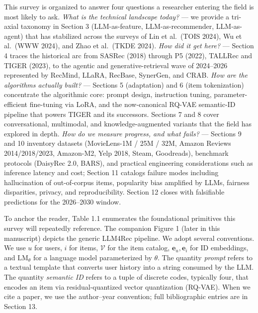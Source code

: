 This survey is organized to answer four questions a researcher entering the field is most likely to ask. \emph{What is the technical landscape today?} --- we provide a tri-axial taxonomy in Section 3 (LLM-as-feature, LLM-as-recommender, LLM-as-agent) that has stabilized across the surveys of Lin et al.~(TOIS 2024), Wu et al.~(WWW 2024), and Zhao et al.~(TKDE 2024). \emph{How did it get here?} --- Section 4 traces the historical arc from SASRec (2018) through P5 (2022), TALLRec and TIGER (2023), to the agentic and generative-retrieval wave of 2024--2026 represented by RecMind, LLaRA, RecBase, SynerGen, and CRAB. \emph{How are the algorithms actually built?} --- Sections 5 (adaptation) and 6 (item tokenization) concentrate the algorithmic core: prompt design, instruction tuning, parameter-efficient fine-tuning via LoRA, and the now-canonical RQ-VAE semantic-ID pipeline that powers TIGER and its successors. Sections 7 and 8 cover conversational, multimodal, and knowledge-augmented variants that the field has explored in depth. \emph{How do we measure progress, and what fails?} --- Sections 9 and 10 inventory datasets (MovieLens-1M / 25M / 32M, Amazon Reviews 2014/2018/2023, Amazon-M2, Yelp 2018, Steam, Goodreads), benchmark protocols (DaisyRec 2.0, BARS), and practical engineering considerations such as inference latency and cost; Section 11 catalogs failure modes including hallucination of out-of-corpus items, popularity bias amplified by LLMs, fairness disparities, privacy, and reproducibility. Section 12 closes with falsifiable predictions for the 2026--2030 window.

To anchor the reader, Table 1.1 enumerates the foundational primitives this survey will repeatedly reference. The companion Figure 1 (later in this manuscript) depicts the generic LLM4Rec pipeline. We adopt several conventions. We use \(u\) for users, \(i\) for items, \(\mathcal{V}\) for the item catalog, \(\mathbf{e}_u, \mathbf{e}_i\) for ID embeddings, and \(\text{LM}_\theta\) for a language model parameterized by \(\theta\). The quantity \emph{prompt} refers to a textual template that converts user history into a string consumed by the LLM. The quantity \emph{semantic ID} refers to a tuple of discrete codes, typically four, that encodes an item via residual-quantized vector quantization (RQ-VAE). When we cite a paper, we use the author--year convention; full bibliographic entries are in Section 13.

